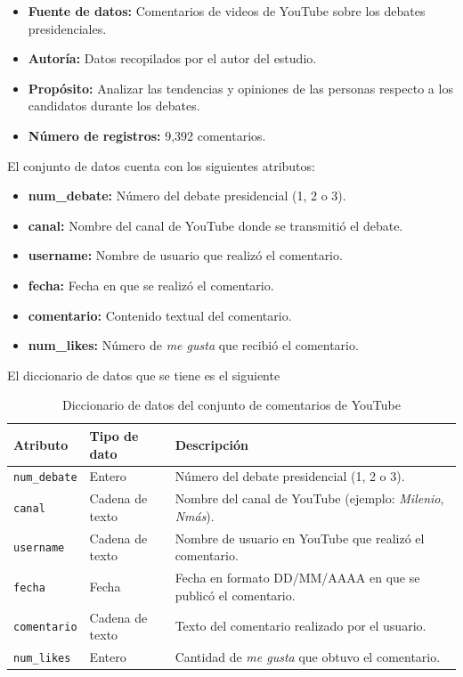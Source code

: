 \documentclass[10pt, a4paper]{article}
\begin{document}
	\begin{itemize}
		\item \textbf{Fuente de datos:} Comentarios de videos de YouTube sobre los debates presidenciales.
		\item \textbf{Autoría:} Datos recopilados por el autor del estudio.
		\item \textbf{Propósito:} Analizar las tendencias y opiniones de las personas respecto a los candidatos durante los debates.
		\item \textbf{Número de registros:} 9,392 comentarios.
	\end{itemize}
	
	El conjunto de datos cuenta con los siguientes atributos:
	
	\begin{itemize}
		\item \textbf{num\_debate:} Número del debate presidencial (1, 2 o 3).
		\item \textbf{canal:} Nombre del canal de YouTube donde se transmitió el debate.
		\item \textbf{username:} Nombre de usuario que realizó el comentario.
		\item \textbf{fecha:} Fecha en que se realizó el comentario.
		\item \textbf{comentario:} Contenido textual del comentario.
		\item \textbf{num\_likes:} Número de \textit{me gusta} que recibió el comentario.
	\end{itemize}
	
	El diccionario de datos que se tiene es el siguiente
	
	\begin{table}[h]
		\centering
		\begin{tabular}{llp{9cm}}
			\hline
			\textbf{Atributo} & \textbf{Tipo de dato} & \textbf{Descripción} \\
			\hline
			\texttt{num\_debate} & Entero & Número del debate presidencial (1, 2 o 3). \\
			\texttt{canal} & Cadena de texto & Nombre del canal de YouTube (ejemplo: \textit{Milenio}, \textit{Nmás}). \\
			\texttt{username} & Cadena de texto & Nombre de usuario en YouTube que realizó el comentario. \\
			\texttt{fecha} & Fecha & Fecha en formato DD/MM/AAAA en que se publicó el comentario. \\
			\texttt{comentario} & Cadena de texto & Texto del comentario realizado por el usuario. \\
			\texttt{num\_likes} & Entero & Cantidad de \textit{me gusta} que obtuvo el comentario. \\
			\hline
		\end{tabular}
		\caption{Diccionario de datos del conjunto de comentarios de YouTube}
	\end{table}
	
\end{document}
